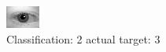 \begin{figure}[h!]
\begin{center}
\includegraphics[width=0.60\columnwidth]{figures/ID580_class_2_target_3.png}
\end{center}
\caption{ Classification: 2 actual target: 3}
\label{fig:ID580_class_2_target_3}
\end{figure}
